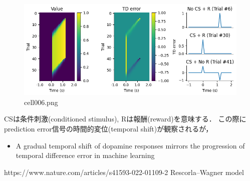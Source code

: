 \begin{figure}[ht]
	\centering
	\includegraphics[scale=0.8, max width=\linewidth]{./fig/reinforcement-learning/td-learning/cell006.png}
	\caption{cell006.png}
	\label{cell006.png}
\end{figure}
CSは条件刺激(conditioned stimulus), Rは報酬(reward)を意味する．
この際にprediction error信号の時間的変位(temporal shift)が観察されるが，
\begin{itemize}
\item A gradual temporal shift of dopamine responses mirrors the progression of temporal difference error in machine learning
\end{itemize}
https://www.nature.com/articles/s41593-022-01109-2
Rescorla–Wagner model
